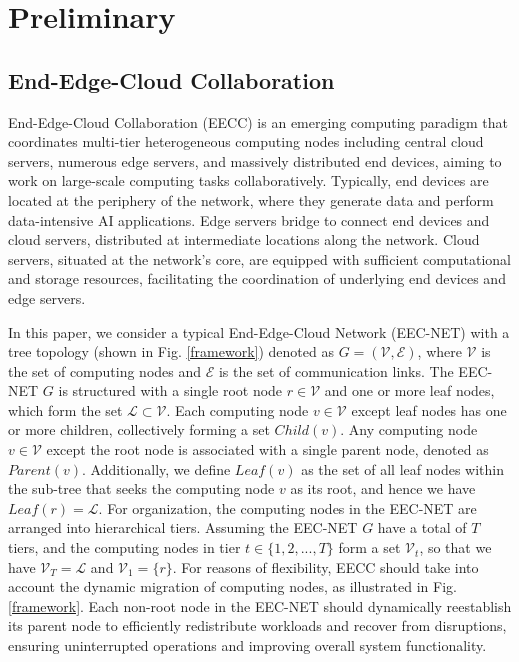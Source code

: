 \documentclass[10pt,journal]{IEEEtran}
\begin{document}
\section{Preliminary}
\subsection{End-Edge-Cloud Collaboration}
  \label{eecc}
    End-Edge-Cloud Collaboration (EECC) is an emerging computing paradigm that coordinates multi-tier heterogeneous computing nodes including central cloud servers, numerous edge servers, and massively distributed end devices, aiming to work on large-scale computing tasks collaboratively. Typically, end devices are located at the periphery of the network, where they generate data and perform data-intensive AI applications.
    Edge servers bridge to connect end devices and cloud servers, distributed at intermediate locations along the network. Cloud servers, situated at the network's core, are equipped with sufficient computational and storage resources, facilitating the coordination of underlying end devices and edge servers.


    In this paper, we consider a typical End-Edge-Cloud Network (EEC-NET) with a tree topology (shown in Fig. \ref{framework}) denoted as $G=(\mathcal{V},\mathcal{E})$, where $\mathcal{V}$ is the set of computing nodes and $\mathcal{E}$ is the set of communication links.
    The EEC-NET $G$ is structured with a single root node $r\in \mathcal{V}$ and one or more leaf nodes, which form the set $\mathcal{L} \subset \mathcal{V}$. 
    Each computing node $v\in \mathcal{V}$ except leaf nodes has one or more children, collectively forming a set $Child(v)$. 
    Any computing node $v\in \mathcal{V}$ except the root node is associated with a single parent node, denoted as $Parent(v)$. 
    Additionally, we define $Leaf(v)$ as the set of all leaf nodes within the sub-tree that seeks the computing node $v$ as its root, and hence we have $Leaf(r)=\mathcal{L}$.   
    For organization, the computing nodes in the EEC-NET are arranged into hierarchical tiers. Assuming the EEC-NET $G$ have a total of $T$ tiers, and the computing nodes in tier $t\in\{1,2,...,T\}$ form a set $\mathcal{V}_t$, so that we have $\mathcal{V}_T=\mathcal{L}$ and $\mathcal{V}_1=\{r\}$.
    For reasons of flexibility, EECC should take into account the dynamic migration of computing nodes, as illustrated in Fig. \ref{framework}. Each non-root node in the EEC-NET should dynamically reestablish its parent node to efficiently redistribute workloads and recover from disruptions, ensuring uninterrupted operations and improving overall system functionality.
\end{document}
